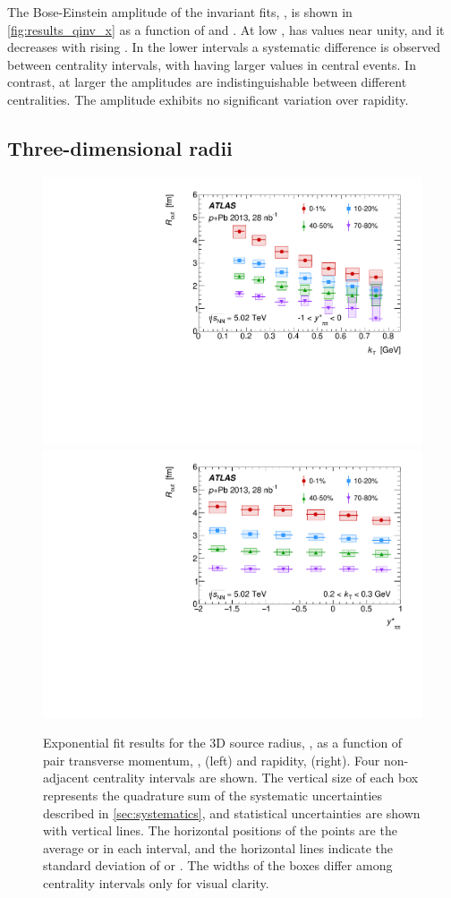 The Bose-Einstein amplitude of the invariant fits, \linv, is shown in \cref{fig:results_qinv_x} as a function of \kt and \kys.
At low \kt, \linv has values near unity, and it decreases with rising \kt.
In the lower \kt intervals a systematic difference is observed between centrality intervals, with \linv having larger values in central events.
In contrast, at larger \kt the amplitudes are indistinguishable between different centralities.
The amplitude exhibits no significant variation over rapidity.

\FloatBarrier
\subsection{Three-dimensional radii}
\label{subsec:3d_results}

\begin{figure}[ht]
\centering
\includegraphics[width=.49\linewidth]{canqosl_Rout_vs_kt.pdf}
\includegraphics[width=.49\linewidth]{canqosl_Rout_vs_kys.pdf}
\caption{Exponential fit results for the 3D source radius, \Rout, as a function of pair transverse momentum, \kt, (left) and rapidity, \kys (right). Four non-adjacent centrality intervals are shown. The vertical size of each box represents the quadrature sum of the systematic uncertainties described in \cref{sec:systematics}, and statistical uncertainties are shown with vertical lines. The horizontal positions of the points are the average \kt or \kys in each interval, and the horizontal lines indicate the standard deviation of \kt or \kys. The widths of the boxes differ among centrality intervals only for visual clarity.}
\label{fig:results_Rout}
\end{figure}

